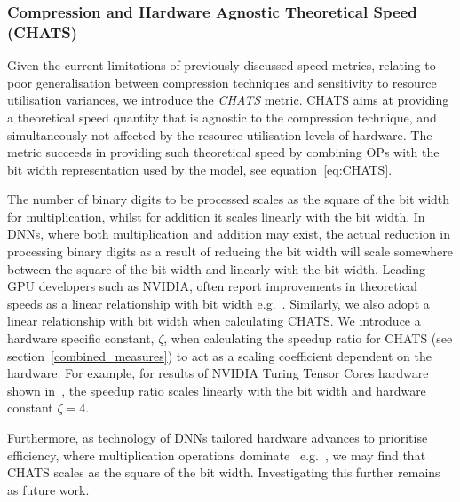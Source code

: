 
\subsubsection{Compression and Hardware Agnostic Theoretical Speed (CHATS)}
Given the current limitations of previously discussed speed metrics, relating to poor generalisation between compression techniques and sensitivity to resource utilisation variances, we introduce the \textit{CHATS} metric.
%
CHATS aims at providing a theoretical speed quantity that is agnostic to the compression technique, and simultaneously not affected by the resource utilisation levels of hardware.
%
The metric succeeds in providing such theoretical speed by combining OPs with the bit width representation used by the model, see equation~\ref{eq:CHATS}.

The number of binary digits to be processed scales as the square of the bit width for multiplication, whilst for addition it scales linearly with the bit width. 
%
In DNNs, where both multiplication and addition may exist, the actual reduction in processing binary digits as a result of reducing the bit width will scale somewhere between the square of the bit width and linearly with the bit width. 
%
Leading GPU developers such as NVIDIA, often report improvements in theoretical speeds as a linear relationship with bit width e.g.~\cite{NVIDIA_TURING_GPU_ARCHITECTURE_2018}.  
%
Similarly, we also adopt a linear relationship with bit width when calculating CHATS. We introduce a hardware specific constant, $\zeta$, when calculating the speedup ratio for CHATS (see section~\ref{combined_measures}) to act as a scaling coefficient dependent on the hardware. 
%
For example, for results of NVIDIA Turing Tensor Cores hardware shown in~\cite{NVIDIA_TURING_GPU_ARCHITECTURE_2018}, the speedup ratio scales linearly with the bit width and hardware constant $\zeta = 4$. 

Furthermore, as technology of DNNs tailored hardware advances to prioritise efficiency, where multiplication operations dominate~ e.g.~\cite{Budgett2022}, we may find that CHATS scales as the square of the bit width. Investigating this further remains as future work. 



